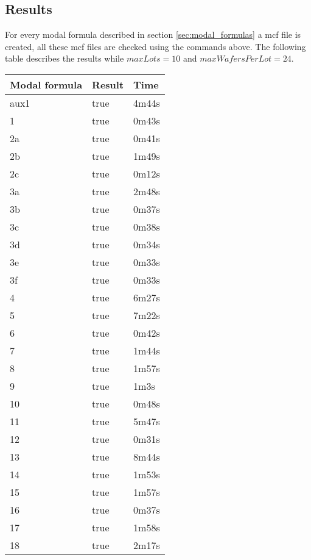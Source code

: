\subsection{Results}
For every modal formula described in section \ref{sec:modal_formulas} a mcf file is created, all these mcf files are checked using the commands above. The following table describes the results while $\mathit{maxLots} = 10$ and $\mathit{maxWafersPerLot} = 24$.
\begin{table}[h]
\label{my-label}
\begin{tabular}{|l|l|l|}
\hline
\textbf{Modal formula} & \textbf{Result} & \textbf{Time} \\ \hline
aux1 & true & 4m44s \\ \hline
1 & true & 0m43s \\ \hline
2a & true & 0m41s \\ \hline
2b & true & 1m49s \\ \hline
2c & true & 0m12s \\ \hline
3a & true & 2m48s \\ \hline
3b & true & 0m37s \\ \hline
3c & true & 0m38s \\ \hline
3d & true & 0m34s \\ \hline
3e & true & 0m33s \\ \hline
3f & true & 0m33s \\ \hline
4 & true & 6m27s \\ \hline
5 & true & 7m22s \\ \hline
6 & true & 0m42s \\ \hline
7 & true & 1m44s \\ \hline
8 & true & 1m57s \\ \hline
9 & true & 1m3s \\ \hline
10 & true & 0m48s \\ \hline
11 & true & 5m47s \\ \hline
12 & true & 0m31s \\ \hline
13 & true & 8m44s \\ \hline
14 & true & 1m53s \\ \hline
15 & true & 1m57s \\ \hline
16 & true & 0m37s \\ \hline
17 & true & 1m58s \\ \hline
18 & true & 2m17s \\ \hline
\end{tabular}
\end{table}